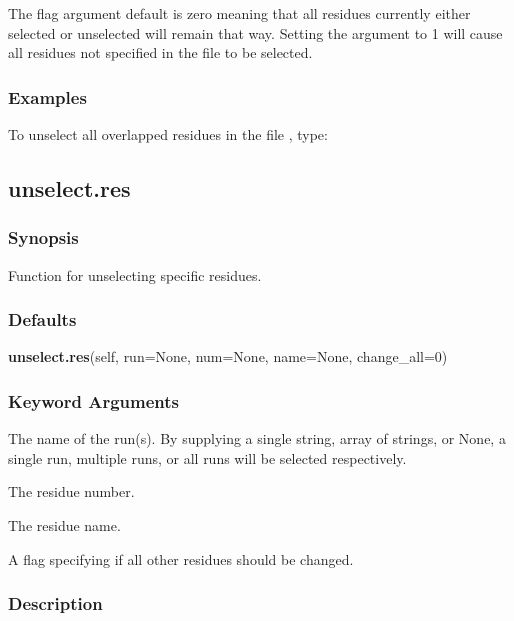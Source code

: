 The 
 flag argument default is zero meaning that all residues currently either
selected or unselected will remain that way.  Setting the argument to 1 will cause all
residues not specified in the file to be selected.


\subsubsection{Examples}

To unselect all overlapped residues in the file 
, type:





\newpage

\subsection{unselect.res}


\subsubsection{Synopsis}

Function for unselecting specific residues.

\subsubsection{Defaults}

\textsf{\textbf{unselect.res}(self, run=None, num=None, name=None, change\_all=0)}


\subsubsection{Keyword Arguments}


  The name of the run(s).  By supplying a single string, array of strings, or None, a single run, multiple runs, or all runs will be selected respectively.

  The residue number.

  The residue name.

  A flag specifying if all other residues should be changed.

\subsubsection{Description}

